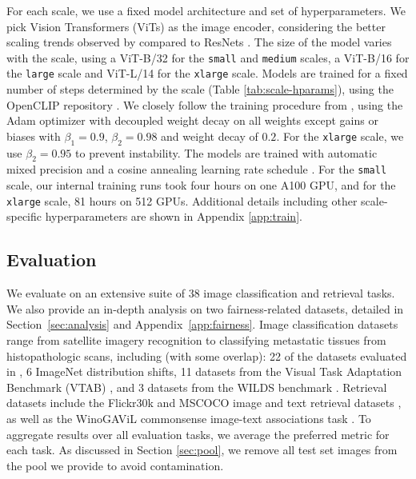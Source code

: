 \documentclass[dvipsnames,11pt]{article}
\begin{document}
For each scale, we use a fixed model architecture and set of hyperparameters. We pick Vision Transformers (ViTs) \cite{dosovitskiy2021an} as the image encoder, considering the better scaling trends observed by \citet{radford2021learning} compared to ResNets \cite{he2016deep}. The size of the model varies with the scale, using a ViT-B/32 for the {\small \texttt{small}} and {\small \texttt{medium}} scales, a ViT-B/16 for the {\small \texttt{large}} scale and ViT-L/14 for the {\small \texttt{xlarge}} scale. Models are trained for a fixed number of steps determined by the scale (Table \ref{tab:scale-hparams}), using the OpenCLIP repository \cite{ilharco2021openclip}. We closely follow the training procedure from \citet{radford2021learning}, using the Adam optimizer \cite{kingma2014adam} with decoupled weight decay \cite{loshchilov2018decoupled} on all weights except gains or biases with $\beta_1=0.9$, $\beta_2=0.98$ and weight decay of $0.2$. For the {\small \texttt{xlarge}} scale, we use $\beta_2=0.95$ to prevent instability. The models are trained with automatic mixed precision and a cosine annealing learning rate schedule \cite{loshchilov2016sgdr}. For the {\small \texttt{small}} scale, our internal training runs took four hours on one A100 GPU, and for the {\small \texttt{xlarge}} scale, 81 hours on 512 GPUs. Additional details including other scale-specific hyperparameters are shown in Appendix \ref{app:train}.


\subsection{Evaluation}
\label{sec:evaluation}

We evaluate on an extensive suite of 38 image classification and retrieval tasks. We also provide an in-depth analysis on two fairness-related datasets, detailed in Section~\ref{sec:analysis} and Appendix~\ref{app:fairness}.
Image classification datasets range from satellite imagery recognition to classifying metastatic tissues from histopathologic scans, including (with some overlap): 22 of the datasets evaluated in \citet{radford2021learning}, 6 ImageNet distribution shifts, 11 datasets from the Visual Task Adaptation Benchmark (VTAB) \cite{vtab}, and 3 datasets from the WILDS benchmark \cite{wilds2021,sagawa2022extending}.
Retrieval datasets include the Flickr30k \cite{flickr30k} and MSCOCO image and text retrieval datasets \cite{mscoco}, as well as the WinoGAViL commonsense image-text associations task \cite{bitton2022winogavil}.
To aggregate results over all evaluation tasks, we average the preferred metric for each task.
As discussed in Section \ref{sec:pool}, we remove all test set images from the pool we provide to avoid contamination.
\end{document}
